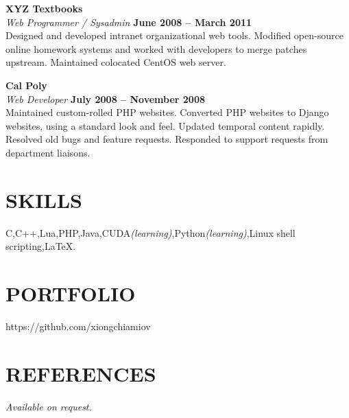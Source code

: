 \documentclass[margin,line]{resume}
\begin{document}
\begin{resume}
    \textbf{\listing XYZ Textbooks} \vspace{2mm}\\\vspace{1mm}%
    \textsl{Web Programmer / Sysadmin} \hfill \textbf{June 2008 -- March 2011}\\
    Designed and developed intranet organizational web tools.
    Modified open-source online homework systems and worked with developers to merge patches upstream.
    Maintained colocated CentOS web server.
    
    \textbf{\listing Cal Poly} \vspace{2mm}\\\vspace{1mm}%
    \textsl{Web Developer} \hfill \textbf{July 2008 -- November 2008}\\
    Maintained custom-rolled PHP websites.
    Converted PHP websites to Django websites, using a standard look and feel.
    Updated temporal content rapidly.
    Resolved old bugs and feature requests.
    Responded to support requests from department liaisons.

\sectionline

    \section{\mysidestyle \textbf{\large{S}\small{KILLS}}}
  
  C,\hspace{2mm}C++,\hspace{2mm}Lua,\hspace{2mm}PHP,\hspace{2mm}Java,\hspace{2mm}CUDA\textsl{\small(learning)},\hspace{2mm}Python\textsl{\small(learning)},\hspace{2mm}Linux shell scripting,\hspace{2mm}\LaTeX.

\sectionline

    \section{\mysidestyle \textbf{\large{P}\small{ORTFOLIO}}}

    https://github.com/xiongchiamiov

\sectionline

\section{\mysidestyle \textbf{\large{R}\small{EFERENCES}}}

    \textsl{Available on request.}

\end{resume}
\end{document}

